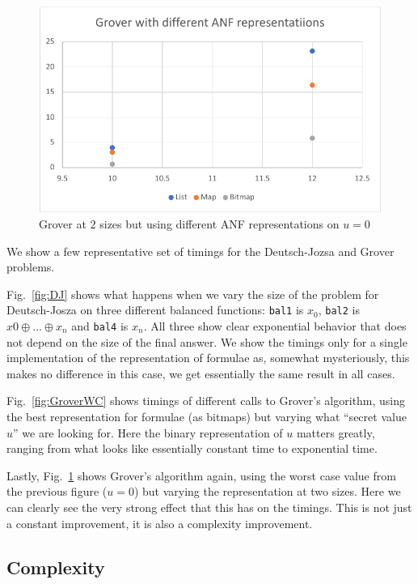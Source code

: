 \documentclass[sigplan,screen]{acmart}
\theoremstyle{definition}
\begin{document}
\begin{figure}
\includegraphics[scale=0.6]{../execution/RetroPE/Grover1.pdf}
  \caption{\label{fig:GroverImpl} Grover at $2$ sizes but using different ANF representations on $u=0$}
\end{figure}

We show a few representative set of timings for the Deutsch-Jozsa and
Grover problems.

Fig.~\ref{fig:DJ} shows what happens when we vary the
size of the problem for Deutsch-Josza on three different balanced
functions: \texttt{bal1} is $x_0$, \texttt{bal2} is $x0\oplus\ldots\oplus x_n$
and \texttt{bal4} is $x_n$. All three show
clear exponential behavior that does not depend on the size of the final
answer. We show the timings only for a single implementation of the
representation of formulae as, somewhat mysteriously, this makes no
difference in this case, we get essentially the same result in all cases.

Fig.~\ref{fig:GroverWC} shows timings of different calls to Grover's
algorithm, using the best representation for formulae (as bitmaps) but varying
what ``secret value $u$'' we are looking for. Here
the binary representation of $u$ matters greatly, ranging from what looks
like essentially constant time to exponential time.

Lastly, Fig.~\ref{fig:GroverImpl} shows Grover's algorithm again, using the
worst case value from the previous figure ($u=0$) but varying the representation
at two sizes. Here we can clearly see the very strong effect that this has
on the timings. This is not just a constant improvement, it is also a complexity
improvement.

\subsection{Complexity}
\label{sub:complexity}
\end{document}

